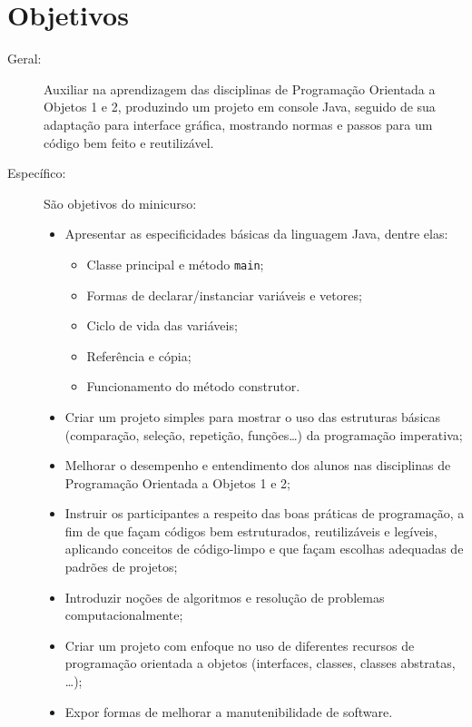 \documentclass{article}
\begin{document}
\section{Objetivos}
\begin{description}
    \item[Geral:] Auxiliar na aprendizagem das disciplinas de
        Programação Orientada a Objetos 1 e 2, produzindo um projeto em
        console Java, seguido de sua adaptação para interface gráfica,
        mostrando normas e passos para um código bem feito e
        reutilizável.
    \item[Específico:] São objetivos do minicurso:
        \begin{itemize}[label={-}]
            \item Apresentar as especificidades básicas da linguagem
                Java, dentre elas:
                \begin{itemize}[label={-}]
                    \item Classe principal e método \texttt{main};
                    \item Formas de declarar/instanciar variáveis e
                        vetores;
                    \item Ciclo de vida das variáveis;
                    \item Referência e cópia;
                    \item Funcionamento do método construtor.
                \end{itemize}
            \item Criar um projeto simples para mostrar o uso das
                estruturas básicas (comparação, seleção, repetição,
                funções\ldots) da programação imperativa;
            \item Melhorar o desempenho e entendimento dos alunos nas
                disciplinas de Programação Orientada a Objetos 1 e 2;
            \item Instruir os participantes a respeito das boas
                práticas de programação, a fim de que façam códigos bem
                estruturados, reutilizáveis e legíveis, aplicando
                conceitos de código-limpo e que façam escolhas
                adequadas de padrões de projetos;
            \item Introduzir noções de algoritmos e resolução de
                problemas computacionalmente;
            \item Criar um projeto com enfoque no uso de diferentes recursos de
                programação orientada a objetos (interfaces, classes, classes
                abstratas, \ldots);
            \item Expor formas de melhorar a manutenibilidade de software.
        \end{itemize}
\end{description}
\end{document}

